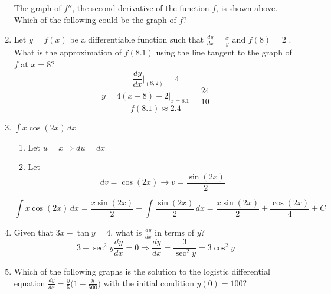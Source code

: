 \documentclass[12pt]{article}
\begin{document}
\begin{enumerate}
\begin{center}
        \end{center}
        The graph of $f''$, the second derivative of the function $f$, is shown above. Which of the following could be the graph of $f$?
        \begin{center}
        \end{center}
    \item Let $y = f(x)$ be a differentiable function such that   $\frac{dy}{dx}=\frac{x}{y}$   and  $f(8)=2$ . What is the approximation of $f (8.1)$ using the line tangent to the graph of $f$ at $x = 8$?
    $$\frac{dy}{dx}\bigg\rvert_{(8,2)}=4$$
    $$y=4(x-8)+2\bigg\rvert_{x=8.1} = \frac{24}{10}$$
    $$\boxed{f(8.1)\approx 2.4}$$
    \item $\int x\cos(2x) \, dx = $
    \begin{enumerate}
        \item Let $u=x \Longrightarrow du=dx$
        \item Let $$dv= \cos(2x) \longrightarrow v= \frac{\sin (2x)}{2}$$
    \end{enumerate}
    $$\int x\cos(2x) \, dx = \frac{x\sin(2x)}{2}-\int \frac{\sin(2x)}{2}\, dx = \boxed{\frac{x\sin(2x)}{2} + \frac{\cos (2x)}{4}+C}$$
    \item Given that $3x - \tan y = 4$, what is $\frac{dy}{dx}$ in terms of $y$?
    $$3-\sec^2 y \frac{dy}{dx}=0 \Longrightarrow \frac{dy}{dx} = \frac{3}{\sec^2 y}= \boxed{3\cos^2 y}$$
    \item Which of the following graphs is the solution to the logistic differential equation $\frac{dy}{dx}=\frac{y}{5}\bigg(1-\frac{y}{500}\bigg)$ with the initial condition  $y(0) = 100$?
    \begin{center}

\end{center}
\end{enumerate}
\end{document}
